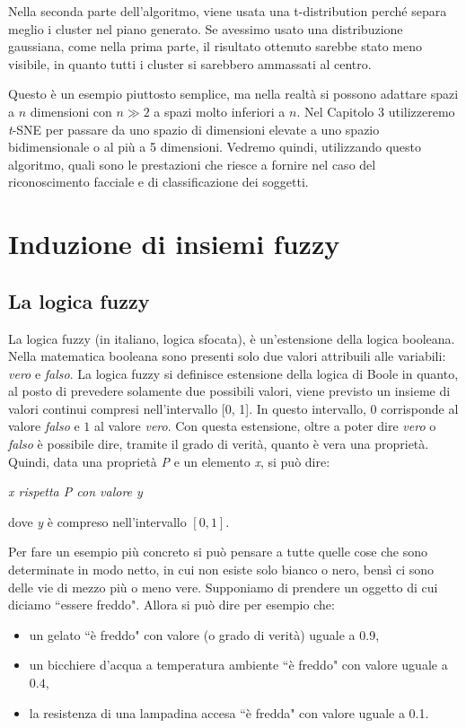 \documentclass[12pt,italian]{report}
\begin{document}
Nella seconda parte dell'algoritmo, viene usata una t-distribution perché separa meglio i cluster nel piano generato. Se avessimo usato una distribuzione gaussiana, come nella prima parte, il risultato ottenuto sarebbe stato meno visibile, in quanto tutti i cluster si sarebbero ammassati al centro.

Questo è un esempio piuttosto semplice, ma nella realtà si possono adattare spazi a $n$ dimensioni con $ n \gg 2 $ a spazi molto inferiori a $n$. Nel Capitolo 3 utilizzeremo \emph{t}-SNE per passare da uno spazio di dimensioni elevate a uno spazio bidimensionale o al più a 5 dimensioni. Vedremo quindi, utilizzando questo algoritmo, quali sono le prestazioni che riesce a fornire nel caso del riconoscimento facciale e di classificazione dei soggetti.
% 
% 


\chapter{Induzione di insiemi fuzzy}
\label{cap:induzione_insiemi_fuzzy}

\section{La logica fuzzy}
La logica fuzzy (in italiano, logica sfocata), è un'estensione della logica booleana. Nella matematica booleana sono presenti solo due valori attribuili alle variabili: \emph{vero} e \emph{falso}. 
La logica fuzzy si definisce estensione della logica di Boole in quanto, al posto di prevedere solamente due possibili valori, viene previsto un insieme di valori continui compresi nell'intervallo [0, 1]. In questo intervallo, $0$ corrisponde al valore \emph{falso} e $1$ al valore \emph{vero}. Con questa estensione, oltre a poter dire \emph{vero} o \emph{falso} è possibile dire, tramite il grado di verità, quanto è vera una proprietà.
Quindi, data una proprietà \emph{P} e un elemento \emph{x}, si può dire:

\begin{center}
	\centering
	{

		\em{x rispetta P con valore y}
		
	}
\end{center} 
dove \emph{y} è compreso nell'intervallo $ [0,1] $.

Per fare un esempio più concreto si può pensare a tutte quelle cose che sono determinate in modo netto, in cui non esiste solo bianco o nero, bensì ci sono delle vie di mezzo più o meno vere.
Supponiamo di prendere un oggetto di cui diciamo ``essere freddo". Allora si può dire per esempio che:
\begin{itemize}
	\item un gelato ``è freddo" con valore (o grado di verità) uguale a 0.9,
	\item un bicchiere d'acqua a temperatura ambiente ``è freddo" con valore uguale a $ 0.4 $,
	\item la resistenza di una lampadina accesa ``è fredda" con valore uguale a 0.1.
\end{itemize}
\end{document}
